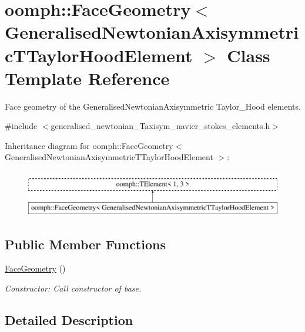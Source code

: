 \hypertarget{classoomph_1_1FaceGeometry_3_01GeneralisedNewtonianAxisymmetricTTaylorHoodElement_01_4}{}\section{oomph\+:\+:Face\+Geometry$<$ Generalised\+Newtonian\+Axisymmetric\+T\+Taylor\+Hood\+Element $>$ Class Template Reference}
\label{classoomph_1_1FaceGeometry_3_01GeneralisedNewtonianAxisymmetricTTaylorHoodElement_01_4}


Face geometry of the Generalised\+Newtonian\+Axisymmetric Taylor\+\_\+\+Hood elements.  




{\ttfamily \#include $<$generalised\+\_\+newtonian\+\_\+\+Taxisym\+\_\+navier\+\_\+stokes\+\_\+elements.\+h$>$}

Inheritance diagram for oomph\+:\+:Face\+Geometry$<$ Generalised\+Newtonian\+Axisymmetric\+T\+Taylor\+Hood\+Element $>$\+:\begin{figure}[H]
\begin{center}
\leavevmode
\includegraphics[height=2.000000cm]{classoomph_1_1FaceGeometry_3_01GeneralisedNewtonianAxisymmetricTTaylorHoodElement_01_4}
\end{center}
\end{figure}
\subsection*{Public Member Functions}
\begin{DoxyCompactItemize}
\item 
\hyperlink{classoomph_1_1FaceGeometry_3_01GeneralisedNewtonianAxisymmetricTTaylorHoodElement_01_4_a7b0c15e37e5771b9860482aa7c90013b}{Face\+Geometry} ()
\begin{DoxyCompactList}\small\item\em Constructor\+: Call constructor of base. \end{DoxyCompactList}\end{DoxyCompactItemize}


\subsection{Detailed Description}
